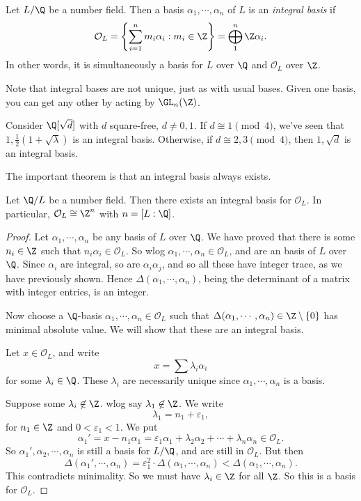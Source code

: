 \documentclass[a4paper]{article}
\begin{document}
\begin{defi}
  Let $L/\Q$ be a number field. Then a basis $\alpha_1, \cdots, \alpha_n$ of $L$ is an \emph{integral basis} if
  \[
    \mathcal{O}_L = \left\{\sum_{i = 1}^n m_i \alpha_i: m_i \in \Z\right\} = \bigoplus_1^n \Z\alpha_i.
  \]
  In other words, it is simultaneously a basis for $L$ over $\Q$ and $\mathcal{O}_L$ over $\Z$.
\end{defi}
Note that integral bases are not unique, just as with usual bases. Given one basis, you can get any other by acting by $\GL_n(\Z)$.

\begin{eg}
  Consider $\Q[\sqrt{d}]$ with $d$ square-free, $d \not= 0, 1$. If $d \cong 1\pmod 4$, we've seen that $1, \frac{1}{2}(1 + \sqrt{\lambda})$ is an integral basis. Otherwise, if $d \cong 2, 3 \pmod 4$, then $1, \sqrt{d}$ is an integral basis.
\end{eg}

The important theorem is that an integral basis always exists.

\begin{thm}
  Let $\Q/L$ be a number field. Then there exists an integral basis for $\mathcal{O}_L$. In particular, $\mathcal{O}_L \cong \Z^n$ with $n = [L:\Q]$.
\end{thm}

\begin{proof}
  Let $\alpha_1, \cdots, \alpha_n$ be any basis of $L$ over $\Q$. We have proved that there is some $n_i \in \Z$ such that $n_i \alpha_i \in \mathcal{O}_L$. So wlog $\alpha_1, \cdots, \alpha_n \in \mathcal{O}_L$, and are an basis of $L$ over $\Q$. Since $\alpha_i$ are integral, so are $\alpha_i \alpha_j$, and so all these have integer trace, as we have previously shown. Hence $\Delta(\alpha_1, \cdots, \alpha_n)$, being the determinant of a matrix with integer entries, is an integer.

  Now choose a $\Q$-basis $\alpha_1, \cdots, \alpha_n \in \mathcal{O}_L$ such that $\Delta(\alpha_1, \cdots, \alpha_n) \in \Z\setminus \{0\}$ has minimal absolute value. We will show that these are an integral basis.

  Let $x \in \mathcal{O}_L$, and write
  \[
    x = \sum \lambda_i \alpha_i
  \]
  for some $\lambda_i \in \Q$. These $\lambda_i$ are necessarily unique since $\alpha_1, \cdots, \alpha_n$ is a basis.

  Suppose some $\lambda_i \not\in \Z$. wlog say $\lambda_1 \not \in \Z$. We write
  \[
    \lambda_1 = n_1 + \varepsilon_1,
  \]
  for $n_1 \in \Z$ and $0 < \varepsilon_1 < 1$. We put
  \[
    \alpha_1' = x - n_1 \alpha_1 = \varepsilon_1 \alpha_1 + \lambda_2 \alpha_2 + \cdots + \lambda_n \alpha_n \in \mathcal{O}_L.
  \]
  So $\alpha_1', \alpha_2, \cdots, \alpha_n$ is still a basis for $L/\Q$, and are still in $\mathcal{O}_L$. But then
  \[
    \Delta(\alpha_1', \cdots, \alpha_n) = \varepsilon_1^2 \cdot \Delta(\alpha_1, \cdots, \alpha_n) < \Delta(\alpha_1, \cdots, \alpha_n).
  \]
  This contradicts minimality. So we must have $\lambda_i \in \Z$ for all $\Z$. So this is a basis for $\mathcal{O}_L$.
\end{proof}
\end{document}
